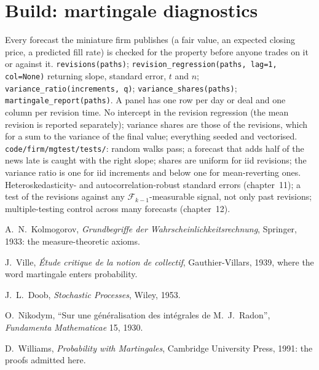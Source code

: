 \section{Build: martingale diagnostics}\label{bld:qm:probability-at-speed:mgtest}

\begin{build}
 Every forecast the miniature firm publishes (a fair value, an expected
closing price, a predicted fill rate) is checked for the  property before anyone
trades on it or against it.
 \texttt{revisions(paths)}; \texttt{revision\_regression(paths, lag=1,
col=None)} returning slope, standard error, $t$ and $n$; \texttt{variance\_ratio(increments,
q)}; \texttt{variance\_shares(paths)}; \texttt{martingale\_report(paths)}. A panel has one
row per day or deal and one column per revision time.
 No intercept in the revision regression (the mean revision is reported
separately); variance shares are those of the revisions, which for a  sum to the
variance of the final value; everything seeded and vectorised.
 \texttt{code/firm/mgtest/tests/}: random walks pass; a forecast
that adds half of the news late is caught with the right slope; shares are uniform for iid
revisions; the variance ratio is one for iid increments and below one for mean-reverting
ones.
 Heteroskedasticity- and autocorrelation-robust standard errors (chapter~11);
a test of the revisions against any $\mathcal F_{k-1}$-measurable signal, not only past
revisions; multiple-testing control across many forecasts (chapter~12).
\end{build}

\begin{omsources}
\item A.~N.~Kolmogorov, \emph{Grundbegriffe der Wahrscheinlichkeitsrechnung}, Springer,
1933: the measure-theoretic axioms.
\item J.~Ville, \emph{Étude critique de la notion de collectif}, Gauthier-Villars, 1939,
where the word martingale enters probability.
\item J.~L.~Doob, \emph{Stochastic Processes}, Wiley, 1953.
\item O.~Nikodym, ``Sur une généralisation des intégrales de M.~J.~Radon'', \emph{Fundamenta
Mathematicae} 15, 1930.
\item D.~Williams, \emph{Probability with Martingales}, Cambridge University Press, 1991: the
proofs admitted here.
\end{omsources}

